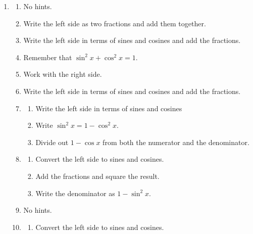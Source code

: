 \documentclass[english]{book}
\begin{document}
\begin{enumerate}
\begin{enumerate}
\begin{enumerate}[\hspace{1cm}a)]
            \vspace{0.3cm}
            
            I'm sure you'll use all this material every day of your life. But, just in case you don't, you now have a handy reference in the unlikely event that some of this should fade from your memory. 
          \end{enumerate}
    \end{enumerate}

    \item \begin{enumerate}  %
        \item No hints.
        \item Write the left side as two fractions and add them together.
        \item Write the left side in terms of sines and cosines and add the fractions.
        \item Remember that $\sin^{2} x + \cos^{2} x = 1$.
        \item Work with the right side.
        \item Write the left side in terms of sines and cosines and add the fractions.
        \item \begin{enumerate}[\hspace{1cm}a)]
                \item Write the left side in terms of sines and cosines
                \item Write $\sin^{2} x = 1 - \cos^{2} x$.
                \item Divide out $1 - \cos x $ from both the numerator and the denominator.
              \end{enumerate}
        \item \begin{enumerate}[\hspace{1cm}a)]
                \item Convert the left side to sines and cosines.
                \item Add the fractions and square the result.
                \item Write the denominator as $1- \sin^{2} x$.
              \end{enumerate}
        \item No hints.
        \item \begin{enumerate}[\hspace{1cm}a)]
                \item Convert the left side to sines and cosines.

\end{enumerate}
\end{enumerate}
\end{enumerate}
\end{document}
